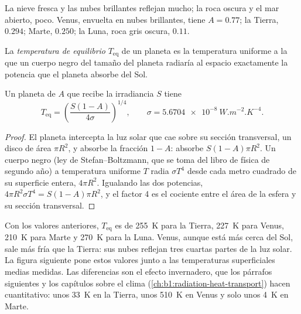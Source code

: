 La nieve fresca y las nubes brillantes reflejan mucho; la roca oscura y el mar abierto, poco.
Venus, envuelta en nubes brillantes, tiene $A = 0.77$; la Tierra, $0.294$; Marte, $0.250$; la
Luna, roca gris oscura, $0.11$.

\begin{definition}\label{def:b1:comparative-planetology:equilibrium-temperature}
La \emph{temperatura de equilibrio} $T_\mathrm{eq}$ de un planeta
es la temperatura uniforme a la que un cuerpo negro del tamaño del planeta radiaría al espacio
exactamente la potencia que el planeta absorbe del Sol.
\end{definition}

\begin{proposition}\label{prop:b1:comparative-planetology:teq}
Un planeta de  $A$ que recibe la irradiancia $S$ tiene
\[
  T_\mathrm{eq} = \left(\frac{S(1 - A)}{4\sigma}\right)^{1/4},
  \qquad \sigma = \qty{5.6704e-8}{W.m^{-2}.K^{-4}} .
\]
\end{proposition}

\begin{proof}
El planeta intercepta la luz solar que cae sobre su sección transversal, un disco de área
$\pi R^2$, y absorbe la fracción $1 - A$: absorbe $S(1 - A)\pi
R^2$. Un cuerpo negro (ley de
Stefan--Boltzmann, que se toma del libro de física de segundo año) a temperatura uniforme $T$
radia $\sigma T^4$ desde cada metro cuadrado de su superficie entera, $4\pi R^2$. Igualando las
dos potencias, $4\pi R^2\sigma T^4 = S(1 - A)\pi R^2$, y el factor 4 es el cociente entre el área
de la esfera y su sección transversal.
\end{proof}

Con los valores anteriores, $T_\mathrm{eq}$ es de \qty{255}{K} para la Tierra,
\qty{227}{K} para Venus, \qty{210}{K} para Marte y \qty{270}{K} para la Luna. Venus, aunque
está más cerca del Sol, sale más fría que la Tierra: sus nubes reflejan tres cuartas partes
de la luz solar. La figura siguiente pone estos valores junto a las temperaturas superficiales
medias medidas. Las diferencias son el efecto invernadero, que los párrafos siguientes y los
capítulos sobre el clima (\cref{ch:b1:radiation-heat-transport}) hacen cuantitativo: unos
\qty{33}{K} en la Tierra, unos \qty{510}{K} en Venus y solo unos \qty{4}{K} en Marte.


